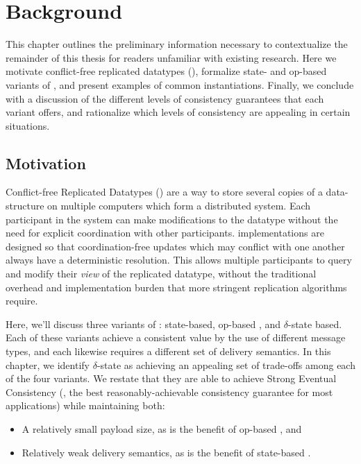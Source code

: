 \chapter{Background}
\label{chap:background}

This chapter outlines the preliminary information necessary to contextualize the
remainder of this thesis for readers unfamiliar with existing \CRDT research.
Here we motivate conflict-free replicated datatypes (\CRDTs), formalize state-
and op-based variants of \CRDTs, and present examples of common instantiations.
Finally, we conclude with a discussion of the different levels of consistency
guarantees that each \CRDT variant offers, and rationalize which levels of
consistency are appealing in certain situations.

\section{Motivation}
Conflict-free Replicated Datatypes (\CRDTs) are a way to store several copies of
a data-structure on multiple computers which form a distributed system. Each
participant in the system can make modifications to the datatype without
the need for explicit coordination with other participants. \CRDT
implementations are designed so that coordination-free updates which may
conflict with one another always have a deterministic resolution. This allows
multiple participants to query and modify their \emph{view} of the replicated
datatype, without the traditional overhead and implementation burden that more
stringent replication algorithms require.

Here, we'll discuss three variants of \CRDTs: state-based, op-based , and
$\delta$-state based. Each of these variants achieve a consistent value by the
use of different message types, and each likewise requires a different set of
delivery semantics. In this chapter, we identify $\delta$-state \CRDTs as
achieving an appealing set of trade-offs among each of the four variants. We
restate that they are able to achieve Strong Eventual Consistency (\SEC, the
best reasonably-achievable consistency guarantee for most \CRDT applications)
while maintaining both:
\begin{itemize}
  \item A relatively small payload size, as is the benefit of op-based \CRDTs,
    and
  \item Relatively weak delivery semantics, as is the benefit of state-based
    \CRDTs.
\end{itemize}

